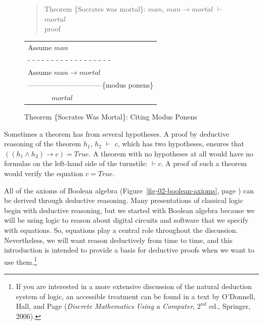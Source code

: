 \begin{figure}
\begin{quote}
Theorem \{Socrates was mortal\}: $man$, $man \rightarrow mortal$ $\vdash$ $mortal$ \\
proof
\end{quote}
\begin{center}
\begin{tabular}{l}
Assume $man$                    \\
 - - - - - - - - - - - - - - - - - -\\
Assume $man \rightarrow mortal$ \\
--------------------------------\{modus ponens\} \\
~~~~~~ $mortal$                 \\
\end{tabular}
\end{center}
\caption{Theorem \{Socrates Was Mortal\}: Citing Modus Ponens}
\label{fig:socrates-proof}
\end{figure}

Sometimes a theorem has from several hypotheses.
A proof by deductive reasoning of the theorem
$h_1$, $h_2$ $\vdash$ $c$,
which has two hypotheses,
ensures that
$((h_1 \wedge h_2) \rightarrow c) = True$.
A theorem with no hypotheses at all
would have no formulas on the left-hand side of the turnstile:
$\vdash c$.
A proof of such a theorem would
verify the equation $c = True$.

All of the axioms of Boolean algebra
(Figure~\ref{fig-02-boolean-axioms}, page \pageref{fig-02-boolean-axioms})
can be derived through deductive reasoning.
Many presentations of classical logic begin with
deductive reasoning,
but we started with Boolean algebra
because we will be using logic to reason about
digital circuits and software that we
specify with equations.
So, equations play a central role throughout the discussion.
Nevertheless, we will want reason deductively from time to time,
and this introduction is intended to provide a basis for
deductive proofs when we want to use them.\footnote{If
you are interested in a more extensive discussion of the natural deduction
system of logic, an accessible treatment can be found
in a text by O'Donnell, Hall, and Page
(\emph{Discrete Mathematics Using a Computer}, $2^{nd}$ ed., Springer, 2006).}

